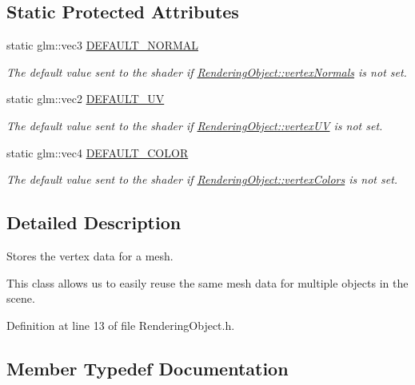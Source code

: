 \subsection*{Static Protected Attributes}
\begin{DoxyCompactItemize}
\item 
static glm\+::vec3 \hyperlink{class_rendering_object_af270a476ba12c23fefbb034e21930add}{D\+E\+F\+A\+U\+L\+T\+\_\+\+N\+O\+R\+M\+A\+L}
\begin{DoxyCompactList}\small\item\em The default value sent to the shader if \hyperlink{class_rendering_object_ac28d301f97d29ab603f65f8e823063b4}{Rendering\+Object\+::vertex\+Normals} is not set. \end{DoxyCompactList}\item 
static glm\+::vec2 \hyperlink{class_rendering_object_a3dcb28a12f578630aea75cc59ea39588}{D\+E\+F\+A\+U\+L\+T\+\_\+\+U\+V}
\begin{DoxyCompactList}\small\item\em The default value sent to the shader if \hyperlink{class_rendering_object_afc405316bddec4ba1d5c228ecc0d9061}{Rendering\+Object\+::vertex\+U\+V} is not set. \end{DoxyCompactList}\item 
static glm\+::vec4 \hyperlink{class_rendering_object_a3bf21996dc0ef604b2b81d95275c97f9}{D\+E\+F\+A\+U\+L\+T\+\_\+\+C\+O\+L\+O\+R}
\begin{DoxyCompactList}\small\item\em The default value sent to the shader if \hyperlink{class_rendering_object_a65fc52e665791ce55e43106b603e917a}{Rendering\+Object\+::vertex\+Colors} is not set. \end{DoxyCompactList}\end{DoxyCompactItemize}


\subsection{Detailed Description}
Stores the vertex data for a mesh. 

This class allows us to easily reuse the same mesh data for multiple objects in the scene. 

Definition at line 13 of file Rendering\+Object.\+h.



\subsection{Member Typedef Documentation}
\hypertarget{class_rendering_object_a8a12e1f9be788d99af6c089e1c600022}{}
